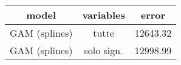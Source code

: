\begin{table}[tb]
\centering
\begin{tabular}{| c | c | c }
  \hline
model & variables & error \\ 
  \hline
GAM (splines) & tutte & 12643.32 \\ 
  GAM (splines) & solo sign. & 12998.99 \\ 
   \hline
\end{tabular}
\caption{} 
\label{}
\end{table}
